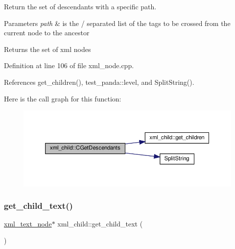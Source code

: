 Return the set of descendants with a specific path. 


\begin{DoxyParams}{Parameters}
{\em path} & is the / separated list of the tags to be crossed from the current node to the ancestor \\
\hline
\end{DoxyParams}
\begin{DoxyReturn}{Returns}
the set of xml nodes 
\end{DoxyReturn}


Definition at line 106 of file xml\+\_\+node.\+cpp.



References get\+\_\+children(), test\+\_\+panda\+::level, and Split\+String().

Here is the call graph for this function\+:
\nopagebreak
\begin{figure}[H]
\begin{center}
\leavevmode
\includegraphics[width=350pt]{d7/df9/classxml__child_ae73bf4c48fc19ebe96e54bfdad7cfe5a_cgraph}
\end{center}
\end{figure}
\mbox{\label{classxml__child_aad2e6a11fcbe5e07fe1269444c9ab0ea}} 
\subsubsection{\texorpdfstring{get\+\_\+child\+\_\+text()}{get\_child\_text()}\hspace{0.1cm}{\footnotesize\ttfamily [1/2]}}
{\footnotesize\ttfamily \hyperlink{classxml__text__node}{xml\+\_\+text\+\_\+node}$\ast$ xml\+\_\+child\+::get\+\_\+child\+\_\+text (\begin{DoxyParamCaption}{ }\end{DoxyParamCaption})\hspace{0.3cm}{\ttfamily [inline]}}



